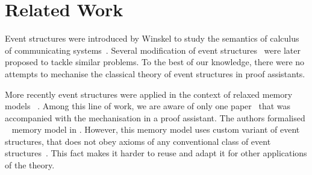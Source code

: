 \section{Related Work}


Event structures were introduced by Winskel to study the semantics of 
calculus of communicating systems~\cite{Winskel:82}. 
Several modification of event structures~\cite{Langerak:91, Boudol-Castellani:1991}
were later proposed to tackle similar problems.  
To the best of our knowledge, there were no attempts 
to mechanise the classical theory of event structures 
in proof assistants. 
 
More recently event structures were applied 
in the context of relaxed memory models~%
\cite{Jeffrey-Riely:LICS16, PichonPharabod-Sewell:POPL16, Chakraborty-Vafeiadis:POPL19, Moiseenko-al:ECOOP20}.
Among this line of work, we are aware of only one paper~\cite{Moiseenko-al:ECOOP20}
that was accompanied with the mechanisation in a proof assistant. 
The authors formalised \weakestmo~\cite{Chakraborty-Vafeiadis:POPL19} 
memory model in \coq. However, this memory model uses 
custom variant of event structures, that does not 
obey axioms of any conventional class of 
event structures~\cite{Winskel:82, Langerak:91, Boudol-Castellani:1991}. 
This fact makes it harder to reuse and adapt it 
for other applications of the theory. 

